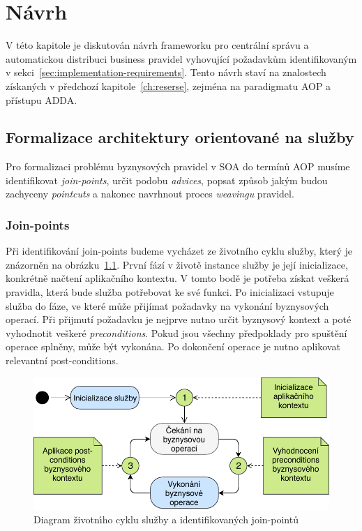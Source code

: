 
\chapter{Návrh}\label{ch:navrh}

V této kapitole je diskutován návrh frameworku pro centrální správu
a automatickou distribuci business pravidel vyhovující požadavkům identifikovaným
v sekci~\ref{sec:implementation-requirements}. Tento návrh staví na znalostech získaných
v předchozí kapitole~\ref{ch:reserse}, zejména na paradigmatu \gls{AOP} a přístupu \gls{ADDA}.

\section{Formalizace architektury orientované na služby}

Pro formalizaci problému byznysových pravidel v \gls{SOA} do termínů \gls{AOP} musíme
identifikovat \textit{join-points}, určit podobu \textit{advices}, popsat způsob jakým budou
zachyceny \textit{pointcuts} a nakonec navrhnout proces \textit{weavingu} pravidel.

\subsection{Join-points}

Při identifikování join-points budeme vycházet ze životního cyklu služby, který je znázorněn
na obrázku~\ref{fig:join-points}. První fází v životě instance služby je její inicializace,
konkrétně načtení aplikačního kontextu. V tomto bodě je potřeba získat veškerá pravidla, která
bude služba potřebovat ke své funkci.
Po inicializaci vstupuje služba do fáze, ve které může přijímat požadavky
na vykonání byznysových operací. Při přijmutí požadavku je nejprve nutno určit
byznysový kontext a poté vyhodnotit veškeré \textit{preconditions}. Pokud jsou všechny předpoklady
pro spuštění operace splněny, může být vykonána. Po dokončení operace je nutno aplikovat relevantní
post-conditions.

\begin{figure}
    \centering
    \includegraphics[keepaspectratio=true, width=0.6\linewidth]{figures/join-points.pdf}
    \caption{Diagram životn\'{\i}ho cyklu služby a identifikovan\'ych join-pointů}
    \label{fig:join-points}
\end{figure}

